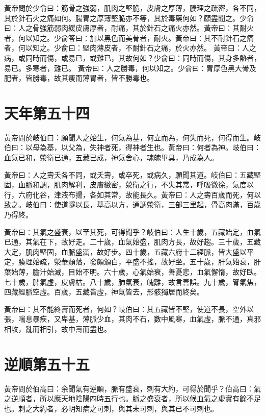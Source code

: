 黃帝問於少俞曰：筋骨之強弱，肌肉之堅脆，皮膚之厚薄，腠理之疏密，各不同，其於針石火之痛如何。腸胃之厚薄堅脆亦不等，其於毒藥何如？願盡聞之。少俞曰：人之骨強筋弱肉緩皮膚厚者，耐痛，其於針石之痛火亦然。黃帝曰：其耐火者，何以知之。少俞答曰：加以黑色而美骨者，耐火。黃帝曰：其不耐針石之痛者，何以知之。少俞曰：堅肉薄皮者，不耐針石之痛，於火亦然。
黃帝曰：人之病，或同時而傷，或易已，或難已，其故何如？少俞曰：同時而傷，其身多熱者，易已。多寒者，難已。
黃帝曰：人之勝毒，何以知之。少俞曰：胃厚色黑大骨及肥者，皆勝毒，故其瘦而薄胃者，皆不勝毒也。



\section{天年第五十四}

黃帝問於岐伯曰：願聞人之始生，何氣為基，何立而為，何失而死，何得而生。岐伯曰：以母為基，以父為，失神者死，得神者生也。黃帝曰：何者為神。岐伯曰：血氣已和，滎衛已通，五藏已成，神氣舍心，魂魄畢具，乃成為人。

黃帝曰：人之壽夭各不同，或夭壽，或卒死，或病久，願聞其道。岐伯曰：五藏堅固，血脈和調，肌肉解利，皮膚緻密，滎衛之行，不失其常，呼吸微徐，氣度以行，六府化谷，津液布揚，各如其常，故能長久。黃帝曰：人之壽百歲而死，何以致之。岐伯曰：使道隧以長，基高以方，通調滎衛，三部三里起，骨高肉滿，百歲乃得終。

黃帝曰：其氣之盛衰，以至其死，可得聞乎？岐伯曰：人生十歲，五藏始定，血氣已通，其氣在下，故好走。二十歲，血氣始盛，肌肉方長，故好趨。三十歲，五藏大定，肌肉堅固，血脈盛滿，故好步。四十歲，五藏六府十二經脈，皆大盛以平定，腠理始疏，滎華頹落，發頗頒白，平盛不搖，故好坐。五十歲，肝氣始衰，肝葉始薄，膽汁始滅，目始不明。六十歲，心氣始衰，善憂悲，血氣懈惰，故好臥。七十歲，脾氣虛，皮膚枯。八十歲，肺氣衰，魄離，故言善誤。九十歲，腎氣焦，四藏經脈空虛。百歲，五藏皆虛，神氣皆去，形骸獨居而終矣。

黃帝曰：其不能終壽而死者，何如？岐伯曰：其五藏皆不堅，使道不長，空外以張，喘息暴疾，又卑基，薄脈少血，其肉不石，數中風寒，血氣虛，脈不通，真邪相攻，亂而相引，故中壽而盡也。



\section{逆順第五十五}

黃帝問於伯高曰：余聞氣有逆順，脈有盛衰，刺有大約，可得於聞乎？伯高曰：氣之逆順者，所以應天地陰陽四時五行也。脈之盛衰者，所以候血氣之虛實有餘不足也。刺之大約者，必明知病之可刺，與其未可刺，與其已不可剌也。

